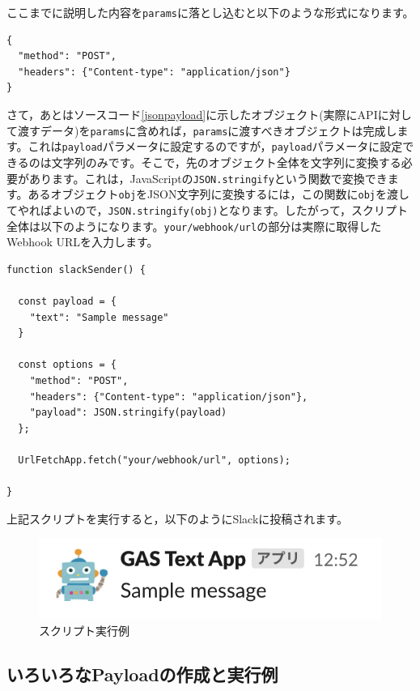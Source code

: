 \documentclass[uplatex,a4j]{jsarticle}
\begin{document}
ここまでに説明した内容を\verb|params|に落とし込むと以下のような形式になります。

\begin{lstlisting}[basicstyle=\ttfamily\footnotesize,frame=single,caption=params argument for UrlFetchApp]
{
  "method": "POST",
  "headers": {"Content-type": "application/json"}
}
\end{lstlisting}

さて，あとはソースコード\ref{jsonpayload}に示したオブジェクト(実際にAPIに対して渡すデータ)を\verb|params|に含めれば，\verb|params|に渡すべきオブジェクトは完成します。これは\verb|payload|パラメータに設定するのですが，\verb|payload|パラメータに設定できるのは文字列のみです。そこで，先のオブジェクト全体を文字列に変換する必要があります。これは，JavaScriptの\verb|JSON.stringify|という関数で変換できます。あるオブジェクト\verb|obj|をJSON文字列に変換するには，この関数に\verb|obj|を渡してやればよいので，\verb|JSON.stringify(obj)|となります。したがって，スクリプト全体は以下のようになります。\verb|your/webhook/url|の部分は実際に取得したWebhook URLを入力します。

\begin{lstlisting}[basicstyle=\ttfamily\footnotesize,frame=single,caption=Incoming Webhook Sample]
function slackSender() {
  
  const payload = {
    "text": "Sample message"
  }
  
  const options = {
    "method": "POST",
    "headers": {"Content-type": "application/json"},
    "payload": JSON.stringify(payload)
  };
        
  UrlFetchApp.fetch("your/webhook/url", options);
  
}
\end{lstlisting}

上記スクリプトを実行すると，以下のようにSlackに投稿されます。

\begin{figure}[H]
 \centering
 \includegraphics[keepaspectratio, scale=1.0]{images/standalone_gas3.png}
 \caption{スクリプト実行例}
 \label{fig:standalone_gas3}
\end{figure}


\subsection{いろいろなPayloadの作成と実行例}
\end{document}

